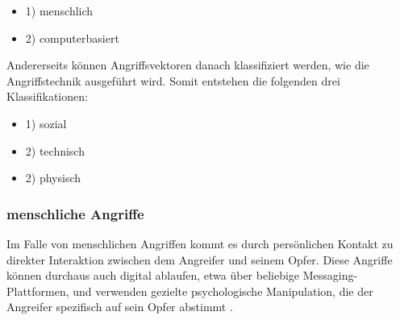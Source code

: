 \begin{minipage}{.5\linewidth}
    \begin{itemize}
        \setlength\itemsep{1em}
        \item 1) menschlich
        \item 2) computerbasiert
    \end{itemize}
\end{minipage}
\hfill
\begin{minipage}{.5\linewidth}
    \centering
\end{minipage}

Andererseits können Angriffsvektoren danach klassifiziert werden, wie die Angriffstechnik ausgeführt wird.
Somit entstehen die folgenden drei Klassifikationen:

\begin{minipage}{.5\linewidth}
    \begin{itemize}
        \setlength\itemsep{1em}
        \item 1) sozial
        \item 2) technisch
        \item 2) physisch
    \end{itemize}
\end{minipage}
\hfill
\begin{minipage}{.5\linewidth}
    \centering
\end{minipage}

\subsubsection{menschliche Angriffe}
Im Falle von menschlichen Angriffen kommt es durch persönlichen Kontakt zu direkter Interaktion zwischen dem Angreifer und seinem Opfer.
Diese Angriffe können durchaus auch digital ablaufen, etwa über beliebige Messaging-Plattformen, und verwenden gezielte psychologische Manipulation,
die der Angreifer spezifisch auf sein Opfer abstimmt .

